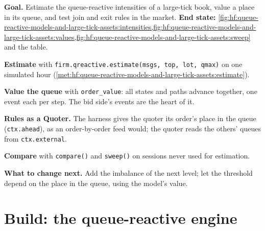 \begin{tutorial}
\textbf{Goal.} Estimate the queue-reactive intensities of a large-tick book, value a place in its queue, and test join and exit rules in the
market. \textbf{End state:} \cref{fig:hf:queue-reactive-models-and-large-tick-assets:intensities,fig:hf:queue-reactive-models-and-large-tick-assets:values,fig:hf:queue-reactive-models-and-large-tick-assets:sweep}
and the table.
\begin{tutsteps}
\item \textbf{Estimate} with \texttt{firm.qreactive.estimate(msgs, top, lot, qmax)} on one simulated hour (\cref{met:hf:queue-reactive-models-and-large-tick-assets:estimate}).
\item \textbf{Value the queue} with \texttt{order\_value}: all states and paths advance together, one event each per step. The bid side's events
are the heart of it.
\label{lst:hf:queue-reactive-models-and-large-tick-assets:mc}
\item \textbf{Rules as a Quoter.} The harness gives the quoter its order's place in the queue (\texttt{ctx.ahead}), as an order-by-order feed
would; the quoter reads the others' queues from \texttt{ctx.external}.
\label{lst:hf:queue-reactive-models-and-large-tick-assets:quoter}
\item \textbf{Compare} with \texttt{compare()} and \texttt{sweep()} on sessions never used for estimation.
\end{tutsteps}
\textbf{What to change next.} Add the imbalance of the next level; let the threshold depend on the place in the queue, using the model's value.
\end{tutorial}

\section{Build: the queue-reactive engine}\label{bld:hf:queue-reactive-models-and-large-tick-assets:qreactive}

